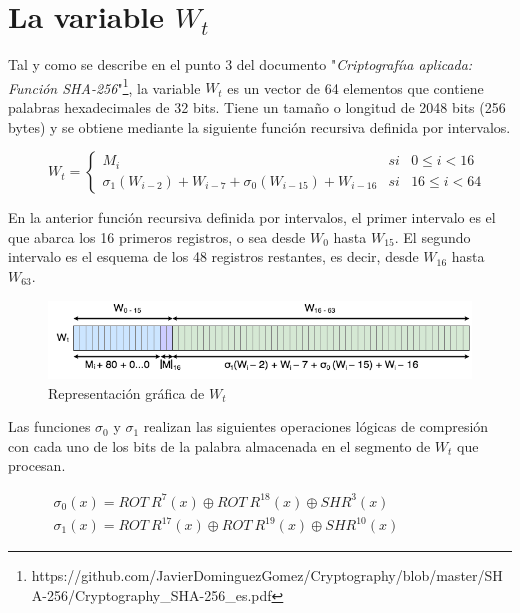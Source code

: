 \documentclass{article}
\begin{document}
\section{La variable $W_t$}
    Tal y como se describe en el punto 3 del documento "\textit{Criptografíıa aplicada: Función SHA-256}"\footnote{https://github.com/JavierDominguezGomez/Cryptography/blob/master/SHA-256/Cryptography\_SHA-256\_es.pdf}, la variable $W_{t}$ es un vector de 64 elementos que contiene palabras hexadecimales de 32 bits. Tiene un tamaño o longitud de 2048 bits (256 bytes) y se obtiene mediante la siguiente función recursiva definida por intervalos.
        \begin{figure}[H]
        \centering
            $W_{t} = \left \{
            \begin{array}{lcl}
                M_{i} & si & 0 \le i < 16 \\
                \sigma_{1}(W_{i-2})+W_{i-7}+\sigma_{0}(W_{i-15})+W_{i-16} & si & 16 \le i < 64
            \end{array}
            \right .$
        \end{figure}
    En la anterior función recursiva definida por intervalos, el primer intervalo es el que abarca los 16 primeros registros, o sea desde $W_{0}$ hasta $W_{15}$. El segundo intervalo es el esquema de los 48 registros restantes, es decir, desde $W_{16}$ hasta $W_{63}$.
        \begin{figure}[H]
        \centering
            \includegraphics[scale=0.5]{img/SHA-256-Wt.png}
            \caption{Representación gráfica de $W_{t}$}
        \end{figure}
    Las funciones  $\sigma_{0}$ y $\sigma_{1}$ realizan las siguientes operaciones lógicas de compresión con cada uno de los bits de la palabra almacenada en el segmento de $W_t$ que procesan.
    \begin{figure}[H]
    \centering
        $\begin{array}{l}
            \sigma_{0}(x) = ROT \ R^{7}(x) \oplus ROT \ R^{18}(x) \oplus SHR^{3}(x) \\
            \sigma_{1}(x) = ROT \ R^{17}(x) \oplus ROT \ R^{19}(x) \oplus SHR^{10}(x)
        \end{array}$
    \end{figure}
    
\end{document}
